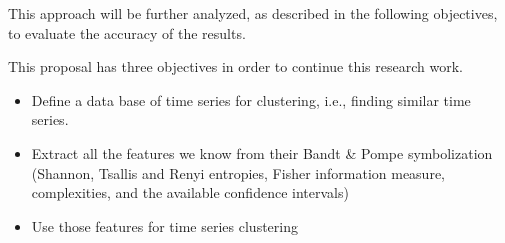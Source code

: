 This approach will be further analyzed, as described in the following objectives, to evaluate the accuracy of the results.

This proposal has three objectives in order to continue this research work.
\begin{itemize}
	\item Define a data base of time series for clustering, i.e., finding similar time series. 
	\item Extract all the features we know from their Bandt \& Pompe symbolization (Shannon, Tsallis and Renyi entropies, Fisher information measure, complexities, and the available confidence intervals)
	\item Use those features for time series clustering 
\end{itemize} 

